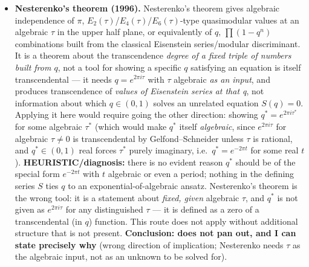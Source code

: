 \documentclass[11pt]{article}
\begin{document}
\begin{itemize}
\item \textbf{Nesterenko's theorem (1996).} Nesterenko's theorem gives algebraic independence
of $\pi$, $E_2(\tau)$/$E_4(\tau)$/$E_6(\tau)$-type quasimodular values at an algebraic $\tau$ in
the upper half plane, or equivalently of $q,\,\prod(1-q^n)$ combinations built from the
classical Eisenstein series/modular discriminant. It is a theorem about the transcendence
\emph{degree of a fixed triple of numbers built from $q$}, not a tool for showing a specific
$q$ satisfying an equation is itself transcendental --- it needs $q=e^{2\pi i\tau}$ with $\tau$
algebraic \emph{as an input}, and produces transcendence of \emph{values of Eisenstein series
at that q}, not information about which $q\in(0,1)$ solves an unrelated equation $S(q)=0$.
Applying it here would require going the other direction: showing $q^\ast=e^{2\pi i \tau^\ast}$
for some algebraic $\tau^\ast$ (which would make $q^\ast$ itself \emph{algebraic}, since
$e^{2\pi i\tau}$ for algebraic $\tau\ne0$ is transcendental by Gelfond--Schneider unless $\tau$
is rational, and $q^\ast\in(0,1)$ real forces $\tau^\ast$ purely imaginary, i.e.\
$q^\ast=e^{-2\pi t}$ for some real $t$). \textbf{HEURISTIC/diagnosis:} there is no evident reason
$q^\ast$ should be of the special form $e^{-2\pi t}$ with $t$ algebraic or even a period; nothing
in the defining series $S$ ties $q$ to an exponential-of-algebraic ansatz. Nesterenko's theorem
is the wrong tool: it is a statement about \emph{fixed, given} algebraic $\tau$, and $q^\ast$ is
not given as $e^{2\pi i\tau}$ for any distinguished $\tau$ --- it is defined as a zero of a
transcendental (in $q$) function. This route does not apply without additional structure that is
not present. \textbf{Conclusion: does not pan out, and I can state precisely why} (wrong
direction of implication; Nesterenko needs $\tau$ as the algebraic input, not as an unknown to be
solved for).


\end{itemize}
\end{document}
